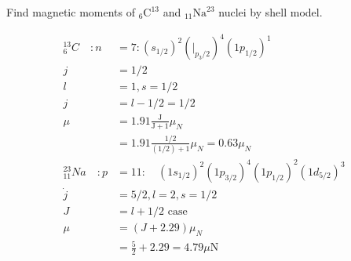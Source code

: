 \begin{exercise}
Find magnetic moments of ${ }_{6} \mathrm{C}^{\mathrm{13}}$ and ${ }_{11}\mathrm{Na}^{\mathrm{23}}$ nuclei by shell model.
\end{exercise}
\begin{answer}
	\begin{align*}
	{ }^{13}_{6}C\quad :n&=7:\left(s_{1 / 2}\right)^{2}\left(\left.\right|_{p_{3} / 2}\right)^{4}\left(1 p_{1 / 2}\right)^{1}\\
	j&=1 / 2 \\
	l&=1, s=1 / 2\\
	j&=l-1 / 2=1 / 2\\
	\mu&=1.91 \frac{\mathrm{J}}{\mathrm{J}+1} \mu_{N}\\
	&=1.91 \frac{1 / 2}{(1 / 2)+1} \mu_{N}=0.63 \mu_{N}\\
	{}^{23}_{11}Na\quad  : p&=11: \quad\left(1 s_{1 / 2}\right)^{2}\left(1 p_{3 / 2}\right)^{4}\left(1 p_{1 / 2}\right)^{2}\left(1 d_{5 / 2}\right)^{3}\\
	\dot{j}&=5 / 2, l=2, s=1 / 2\\
	J&=l+1 / 2 \text { case }\\
	\mu&=(J+2.29) \mu_{N}\\
	&=\frac{5}{2}+2.29=4.79 \mu \mathrm{N}
	\end{align*}
\end{answer}
